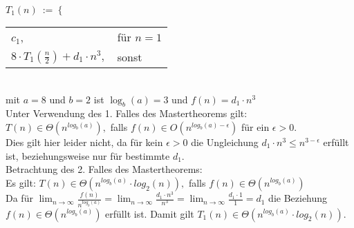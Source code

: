 $T_1(n)\ :=\ \bigg\{$
\begin{tabular}{ll}
$c_1$,&für $n = 1$\\
$8 \cdot T_1(\frac{n}{2}) + d_1 \cdot n^3,$ &sonst
\end{tabular}\\
mit $a = 8$ und $b = 2$ ist $\log_b(a) = 3$ und $f(n) = d_1 \cdot n^3$\\
Unter Verwendung des 1. Falles des Mastertheorems gilt:\\
$T(n) \in  \Theta(n^{log_b(a)}),$ falls $f(n) \in O(n^{log_b(a) - \epsilon})$ für ein $\epsilon > 0$.\\
Dies gilt hier leider nicht, da für kein $\epsilon > 0$ die Ungleichung $d_1 \cdot n^3 \leq n^{3 - \epsilon}$ erfüllt ist, beziehungsweise nur für bestimmte $d_1$.\\
Betrachtung des 2. Falles des Mastertheorems:\\
Es gilt: $T(n) \in  \Theta(n^{log_b(a)}\cdot log_2(n)),$ falls $f(n) \in \Theta(n^{log_b(a)})$\\
Da für $\lim_{n\to\infty}\frac{f(n)}{n^{log_b(a)}} = \lim_{n\to\infty}\frac{d_1\cdot n^3}{n^{3}} = \lim_{n\to\infty}\frac{d_1\cdot 1}{1} = d_1$ die Beziehung $f(n) \in \Theta(n^{log_b(a)})$ erfüllt ist. Damit gilt $T_1(n) \in \Theta(n^{log_b(a)}\cdot log_2(n))$.

